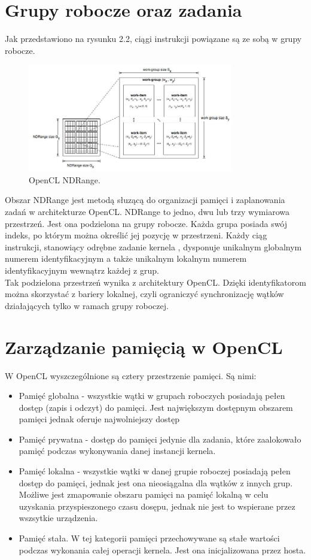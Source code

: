 \section{Grupy robocze oraz zadania}
Jak przedstawiono na rysunku 2.2, ciągi instrukcji powiązane są ze sobą w grupy robocze. \\
\begin{figure}[h]
\centering
\includegraphics[width=0.8\textwidth]{figures/ndrange.jpg}
\caption{OpenCL NDRange.}%
\label{rys:ndrange}
\end{figure}
Obszar NDRange jest metodą słuzącą do organizacji pamięci i zaplanowania zadań w architekturze OpenCL. NDRange to jedno, dwu lub trzy wymiarowa przestrzeń. Jest ona podzielona na grupy robocze. Każda grupa posiada swój indeks, po którym można określić jej pozycję w przestrzeni. Każdy ciąg instrukcji, stanowiący odrębne zadanie kernela , dysponuje unikalnym globalnym numerem identyfikacyjnym a także unikalnym lokalnym numerem identyfikacyjnym wewnątrz każdej z grup.  \\
Tak podzielona przestrzeń wynika z architektury OpenCL. Dzięki identyfikatorom można skorzystać z bariery lokalnej, czyli ograniczyć synchronizację wątków działających tylko w ramach grupy roboczej.

\section{Zarządzanie pamięcią w OpenCL}
W OpenCL wyszczególnione są cztery przestrzenie pamięci. Są nimi:
\begin{itemize}
  \item Pamięć globalna - wszystkie wątki w grupach roboczych posiadają pełen dostęp (zapis i odczyt) do pamięci. Jest największym dostępnym obszarem pamięci jednak oferuje najwolniejszy dostęp
  \item Pamięć prywatna - dostęp do pamięci jedynie dla zadania, które zaalokowało pamięć podczas wykonywania danej instancji kernela.
  \item Pamięć lokalna - wszystkie wątki w danej grupie roboczej posiadają pełen dostęp do pamięci, jednak jest ona nieosiągalna dla wątków z innych grup. Możliwe jest zmapowanie obszaru pamięci na pamięć lokalną w celu uzyskania przyspieszonego czasu dosępu, jednak nie jest to wspierane przez wszsytkie urządzenia.
  \item Pamięć stała. W tej kategorii pamięci przechowywane są stałe wartości podczas wykonania całej operacji kernela. Jest ona inicjalizowana przez hosta.
\end{itemize}


